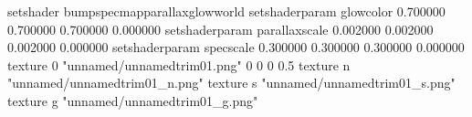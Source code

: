setshader bumpspecmapparallaxglowworld
setshaderparam glowcolor 0.700000 0.700000 0.700000 0.000000
setshaderparam parallaxscale 0.002000 0.002000 0.002000 0.000000
setshaderparam specscale 0.300000 0.300000 0.300000 0.000000
texture 0 "unnamed/unnamedtrim01.png" 0 0 0 0.5
texture n "unnamed/unnamedtrim01_n.png"
texture s "unnamed/unnamedtrim01_s.png"
texture g "unnamed/unnamedtrim01_g.png"